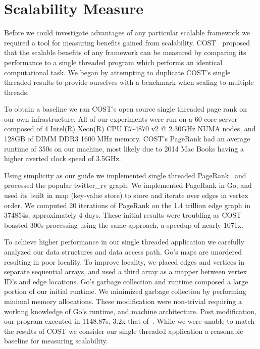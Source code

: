 \section{Scalability Measure}
\label{sec:scalability}

Before we could investigate advantages of any particular scalable
framework we required a tool for measuring benefits gained from
scalability. COST~\cite{189908} proposed that the scalable benefits of
any framework can be measured by comparing its performance to a
single threaded program which performs an identical computational task.
We began by attempting to duplicate COST's single threaded results to
provide ourselves with a benchmark when scaling to multiple threads.

To obtain a baseline we ran COST's open source single threaded page
rank on our own infrastructure. All of our experiments were run on a
60 core server composed of 4 Intel(R) Xeon(R) CPU E7-4870 v2 @ 2.30GHz
NUMA nodes, and 128GB of DIMM DDR3 1600 MHz memory. COST's PageRank had
an average runtime of 350s on our machine, most likely due to 2014 Mac
Books having a higher averted clock speed of 3.5GHz.

Using simplicity as our guide we implemented single threaded
PageRank~\cite{Page98thepagerank} and processed the popular
twitter\_rv graph. We implemented PageRank in Go, and used its built
in map (key-value store) to store and iterate over edges in vertex
order. We computed 20 iterations of PageRank on the 1.4 trillion edge
graph in 374854s, approximately 4 days. These initial results were
troubling as COST boasted 300s processing using the same
approach, a speedup of nearly 1071x.

To achieve higher performance in our single threaded application we
carefully analyzed our data structures and data access path. Go's maps
are unordered resulting in poor locality. To improve locality, we
placed edges and vertices in separate sequential arrays, and used a
third array as a mapper between vertex ID's and edge locations. Go's
garbage collection and runtime composed a large portion of our
initial runtime. We minimized garbage collection by performing
minimal memory allocations. These modification were non-trivial
requiring a working knowledge of Go's runtime, and machine
architecture.  Post modification, our program executed in 1148.87s,
3.2x that of~\cite{189908}. While we were unable to match the results
of COST we consider our single threaded application a reasonable
baseline for measuring scalability.

